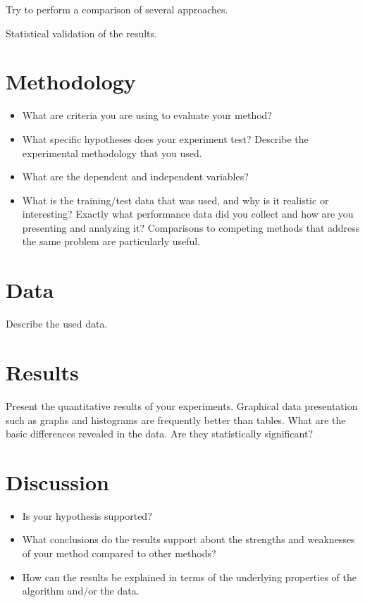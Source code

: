 \documentclass[runningheads,a4paper,11pt]{report}
\begin{document}
Try to perform a comparison of several approaches.

Statistical validation of the results.


\section{Methodology}
\label{section:methodology}

\begin{itemize}
	\item What are criteria you are using to evaluate your method? 
	\item What specific hypotheses does your experiment test? Describe the experimental methodology that you used. 
	\item What are the dependent and independent variables? 
	\item What is the training/test data that was used, and why is it realistic or interesting? Exactly what performance data did you collect and how are you presenting and analyzing it? Comparisons to competing methods that address the same problem are particularly useful.
\end{itemize}

\section{Data}
\label{section:data}

Describe the used data.

\section{Results}
\label{section:results}

Present the quantitative results of your experiments. Graphical data presentation such as graphs and histograms are frequently better than tables. What are the basic differences revealed in the data. Are they statistically significant?

\section{Discussion}
\label{section:discussion}

\begin{itemize}
	\item Is your hypothesis supported? 
	\item What conclusions do the results support about the strengths and weaknesses of your method compared to other methods? 
	\item How can the results be explained in terms of the underlying properties of the algorithm and/or the data. 
\end{itemize}
\end{document}
